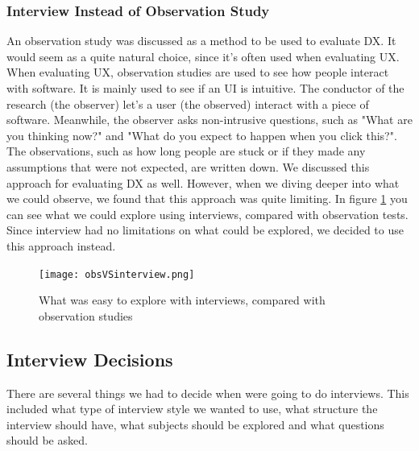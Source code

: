 \documentclass{cslthse-msc}
\begin{document}
    \subsubsection{Interview Instead of Observation Study}
    An observation study was discussed as a method to be used to evaluate DX. It would seem as a quite natural choice, since it's often used when evaluating UX. When evaluating UX, observation studies are used to see how people interact with software. It is mainly used to see if an UI is intuitive. The conductor of the research (the observer) let's a user (the observed) interact with a piece of software. Meanwhile, the observer asks non-intrusive questions, such as "What are you thinking now?" and "What do you expect to happen when you click this?". The observations, such as how long people are stuck or if they made any assumptions that were not expected, are written down. We discussed this approach for evaluating DX as well. However, when we diving deeper into what we could observe, we found that this approach was quite limiting. In figure \ref{fig:obsVSinter} you can see what we could explore using interviews, compared with observation tests. Since interview had no limitations on what could be explored, we decided to use this approach instead.
    \begin{figure}[H]
        \centering
        \texttt{[image: obsVSinterview.png]}
        \caption{What was easy to explore with interviews, compared with observation studies}
        \label{fig:obsVSinter}
    \end{figure}
    \subsection{Interview Decisions}
    There are several things we had to decide when were going to do interviews. This included what type of interview style we wanted to use, what structure the interview should have, what subjects should be explored and what questions should be asked.
\end{document}
